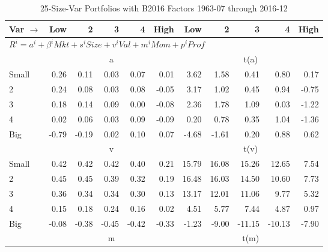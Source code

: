 
\begin{table}[!ht]
\centering
\caption{25-Size-Var Portfolios with B2016 Factors 1963-07 through 2016-12}
\begin{tabular}{lrrrrrrrrrr}
  \toprule
    Var $\rightarrow$ & Low & 2 & 3 & 4 & High & Low & 2 & 3 & 4 & High \\ 
  \midrule
  \multicolumn{11}{l}{$R^i=a^i+\beta^iMkt+s^iSize+v^iVal+m^iMom+p^iProf$} \\

  
    
      & \multicolumn{5}{c}{a} & \multicolumn{5}{c}{t(a)}
    
    \\
      \cmidrule(r){2-6} \cmidrule(r){7-11}

    Small   & 0.26  & 0.11  & 0.03  & 0.07  & 0.01  & 3.62  & 1.58  & 0.41  & 0.80  & 0.17  \\
         2  & 0.24  & 0.08  & 0.03  & 0.08  & -0.05  & 3.17  & 1.02  & 0.45  & 0.94  & -0.75  \\
         3  & 0.18  & 0.14  & 0.09  & 0.00  & -0.08  & 2.36  & 1.78  & 1.09  & 0.03  & -1.22  \\
         4  & 0.02  & 0.06  & 0.03  & 0.09  & -0.09  & 0.20  & 0.78  & 0.35  & 1.04  & -1.36  \\
    Big     & -0.79  & -0.19  & 0.02  & 0.10  & 0.07  & -4.68  & -1.61  & 0.20  & 0.88  & 0.62  \\

  
    
      & \multicolumn{5}{c}{v} & \multicolumn{5}{c}{t(v)}
    
    \\
      \cmidrule(r){2-6} \cmidrule(r){7-11}

    Small   & 0.42  & 0.42  & 0.42  & 0.40  & 0.21  & 15.79  & 16.08  & 15.26  & 12.65  & 7.54  \\
         2  & 0.45  & 0.45  & 0.39  & 0.32  & 0.19  & 16.48  & 16.03  & 14.50  & 10.60  & 7.73  \\
         3  & 0.36  & 0.34  & 0.34  & 0.30  & 0.13  & 13.17  & 12.01  & 11.06  & 9.77  & 5.32  \\
         4  & 0.15  & 0.18  & 0.24  & 0.16  & 0.02  & 4.51  & 5.77  & 7.44  & 4.87  & 0.97  \\
    Big     & -0.08  & -0.38  & -0.45  & -0.42  & -0.33  & -1.23  & -9.00  & -11.15  & -10.13  & -7.90  \\

  
    
      & \multicolumn{5}{c}{m} & \multicolumn{5}{c}{t(m)}
    

\end{tabular}
\end{table}
